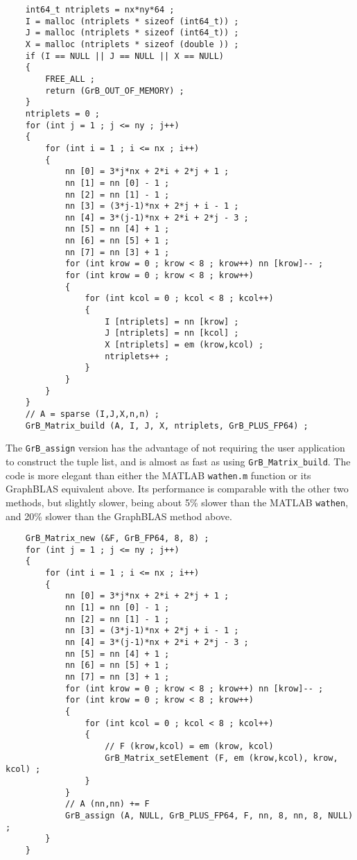 \documentclass[12pt]{article}
\begin{document}
    {\footnotesize
    \begin{verbatim}
    int64_t ntriplets = nx*ny*64 ;
    I = malloc (ntriplets * sizeof (int64_t)) ;
    J = malloc (ntriplets * sizeof (int64_t)) ;
    X = malloc (ntriplets * sizeof (double )) ;
    if (I == NULL || J == NULL || X == NULL)
    {
        FREE_ALL ;
        return (GrB_OUT_OF_MEMORY) ;
    }
    ntriplets = 0 ;
    for (int j = 1 ; j <= ny ; j++)
    {
        for (int i = 1 ; i <= nx ; i++)
        {
            nn [0] = 3*j*nx + 2*i + 2*j + 1 ;
            nn [1] = nn [0] - 1 ;
            nn [2] = nn [1] - 1 ;
            nn [3] = (3*j-1)*nx + 2*j + i - 1 ;
            nn [4] = 3*(j-1)*nx + 2*i + 2*j - 3 ;
            nn [5] = nn [4] + 1 ;
            nn [6] = nn [5] + 1 ;
            nn [7] = nn [3] + 1 ;
            for (int krow = 0 ; krow < 8 ; krow++) nn [krow]-- ;
            for (int krow = 0 ; krow < 8 ; krow++)
            {
                for (int kcol = 0 ; kcol < 8 ; kcol++)
                {
                    I [ntriplets] = nn [krow] ;
                    J [ntriplets] = nn [kcol] ;
                    X [ntriplets] = em (krow,kcol) ;
                    ntriplets++ ;
                }
            }
        }
    }
    // A = sparse (I,J,X,n,n) ;
    GrB_Matrix_build (A, I, J, X, ntriplets, GrB_PLUS_FP64) ; \end{verbatim}}

The \verb'GrB_assign' version has the advantage of not requiring the
user application to construct the tuple list, and is almost as fast as using
\verb'GrB_Matrix_build'.  The code is more elegant than either the MATLAB
\verb'wathen.m' function or its GraphBLAS equivalent above.  Its performance is
comparable with the other two methods, but slightly slower, being about 5\%
slower than the MATLAB \verb'wathen', and 20\% slower than the GraphBLAS
method above.

    {\footnotesize
    \begin{verbatim}
    GrB_Matrix_new (&F, GrB_FP64, 8, 8) ;
    for (int j = 1 ; j <= ny ; j++)
    {
        for (int i = 1 ; i <= nx ; i++)
        {
            nn [0] = 3*j*nx + 2*i + 2*j + 1 ;
            nn [1] = nn [0] - 1 ;
            nn [2] = nn [1] - 1 ;
            nn [3] = (3*j-1)*nx + 2*j + i - 1 ;
            nn [4] = 3*(j-1)*nx + 2*i + 2*j - 3 ;
            nn [5] = nn [4] + 1 ;
            nn [6] = nn [5] + 1 ;
            nn [7] = nn [3] + 1 ;
            for (int krow = 0 ; krow < 8 ; krow++) nn [krow]-- ;
            for (int krow = 0 ; krow < 8 ; krow++)
            {
                for (int kcol = 0 ; kcol < 8 ; kcol++)
                {
                    // F (krow,kcol) = em (krow, kcol)
                    GrB_Matrix_setElement (F, em (krow,kcol), krow, kcol) ;
                }
            }
            // A (nn,nn) += F
            GrB_assign (A, NULL, GrB_PLUS_FP64, F, nn, 8, nn, 8, NULL) ;
        }
    } \end{verbatim}}
\end{document}
